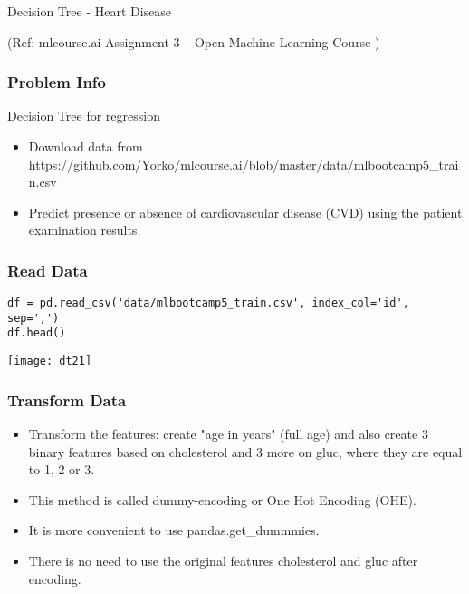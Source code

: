 \begin{frame}[fragile]\frametitle{}
\begin{center}
{\Large Decision Tree - Heart Disease}

{\tiny (Ref: mlcourse.ai Assignment 3 – Open Machine Learning Course ) }
\end{center}

\end{frame}

\begin{frame}[fragile]\frametitle{Problem Info}
Decision Tree for regression	
\begin{itemize}
\item Download data from https://github.com/Yorko/mlcourse.ai/blob/master/data/mlbootcamp5\_train.csv
\item Predict presence or absence of cardiovascular disease (CVD) using the patient examination results.

\end{itemize}
\end{frame}


\begin{frame}[fragile]\frametitle{Read Data}	
\begin{lstlisting}
df = pd.read_csv('data/mlbootcamp5_train.csv', index_col='id', sep=',')
df.head()	 
\end{lstlisting}
\begin{center}
\texttt{[image: dt21]}
\end{center}
\end{frame}

\begin{frame}[fragile]\frametitle{Transform Data}	
\begin{itemize}
\item Transform the features: create "age in years" (full age) and also create 3 binary features based on cholesterol and 3 more on gluc, where they are equal to 1, 2 or 3. 
\item This method is called dummy-encoding or One Hot Encoding (OHE). 
\item It is more convenient to use pandas.get\_dummmies.
\item There is no need to use the original features cholesterol and gluc after encoding.
\end{itemize}
\end{frame}

